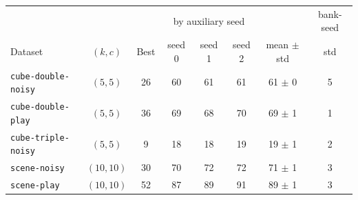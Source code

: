 \begin{tabular}{lcc|ccc|cc}
\toprule
 & & & \multicolumn{3}{c|}{\wmpp{} by auxiliary seed} & & bank-seed \\
Dataset & $(k,c)$ & Best & seed 0 & seed 1 & seed 2 & mean $\pm$ std & std \\
\midrule
\texttt{cube-double-noisy} & $(5,5)$ & 26 & 60 & 61 & 61 & 61 $\pm$ 0 & 5 \\
\texttt{cube-double-play} & $(5,5)$ & 36 & 69 & 68 & 70 & 69 $\pm$ 1 & 1 \\
\texttt{cube-triple-noisy} & $(5,5)$ & 9 & 18 & 18 & 19 & 19 $\pm$ 1 & 2 \\
\texttt{scene-noisy} & $(10,10)$ & 30 & 70 & 72 & 72 & 71 $\pm$ 1 & 3 \\
\texttt{scene-play} & $(10,10)$ & 52 & 87 & 89 & 91 & 89 $\pm$ 1 & 3 \\
\bottomrule
\end{tabular}
